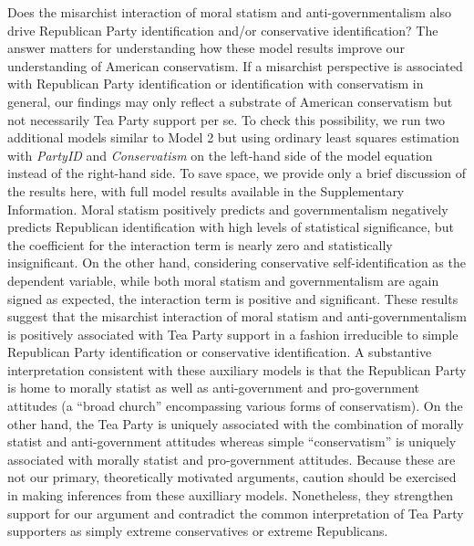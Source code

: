 \documentclass[12pt,]{article}
\begin{document}
Does the misarchist interaction of moral statism and
anti-governmentalism also drive Republican Party identification and/or
conservative identification? The answer matters for understanding how
these model results improve our understanding of American conservatism.
If a misarchist perspective is associated with Republican Party
identification or identification with conservatism in general, our
findings may only reflect a substrate of American conservatism but not
necessarily Tea Party support per se. To check this possibility, we run
two additional models similar to Model 2 but using ordinary least
squares estimation with \emph{PartyID} and \emph{Conservatism} on the
left-hand side of the model equation instead of the right-hand side. To
save space, we provide only a brief discussion of the results here, with
full model results available in the Supplementary Information. Moral
statism positively predicts and governmentalism negatively predicts
Republican identification with high levels of statistical significance,
but the coefficient for the interaction term is nearly zero and
statistically insignificant. On the other hand, considering conservative
self-identification as the dependent variable, while both moral statism
and governmentalism are again signed as expected, the interaction term
is positive and significant. These results suggest that the misarchist
interaction of moral statism and anti-governmentalism is positively
associated with Tea Party support in a fashion irreducible to simple
Republican Party identification or conservative identification. A
substantive interpretation consistent with these auxiliary models is
that the Republican Party is home to morally statist as well as
anti-government and pro-government attitudes (a ``broad church''
encompassing various forms of conservatism). On the other hand, the Tea
Party is uniquely associated with the combination of morally statist and
anti-government attitudes whereas simple ``conservatism'' is uniquely
associated with morally statist and pro-government attitudes. Because
these are not our primary, theoretically motivated arguments, caution
should be exercised in making inferences from these auxilliary models.
Nonetheless, they strengthen support for our argument and contradict the
common interpretation of Tea Party supporters as simply extreme
conservatives or extreme Republicans.
\end{document}
